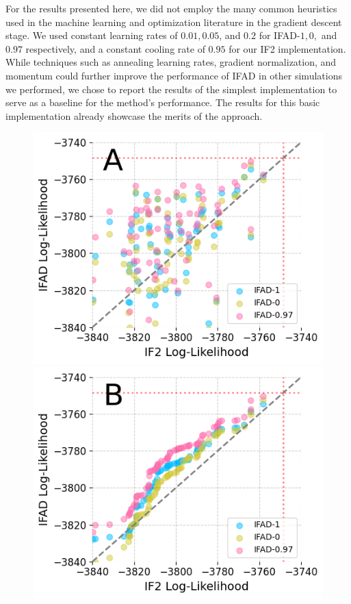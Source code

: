 \documentclass[numsec,webpdf,modern,medium,namedate]{oup-authoring-template}
\newcommand\arxiv[2]{#2} %
\theoremstyle{thmstyleone}%
\theoremstyle{thmstyletwo}%
\theoremstyle{thmstylethree}%
\begin{document}
For the results presented here, we did not employ the many common heuristics used in the machine learning and optimization literature in the gradient descent stage.
We used constant learning rates of $0.01, 0.05$, and $0.2$ for IFAD-$1,0,$ and $0.97$ respectively, and a constant cooling rate of $0.95$ for our IF2 implementation.
While techniques such as annealing learning rates, gradient normalization, and momentum could further improve the performance of IFAD in other simulations we performed, we chose to report the results of the simplest implementation to serve as a baseline for the method's performance.
The results for this basic implementation already showcase the merits of the approach.

\begin{figure}[htbp!]
    \centering
    \vspace{1mm}
    \includegraphics[width=\arxiv{8cm}{\textwidth/\real{2.2}}]{imgs/095/pairs.png}
    \includegraphics[width=\arxiv{8cm}{\textwidth/\real{2.2}}]{imgs/095/qq.png}

\end{figure}
\end{document}
